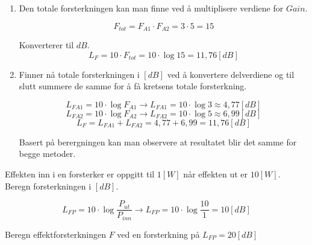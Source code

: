 \begin{solution}[name=Løsningsforslag oppgave]
	\begin{enumerate}[label=\roman*)]
		\item Den totale forsterkningen kan man finne ved å multiplisere verdiene for $Gain$.
		
\[F_{tot}=F_{A1} \cdot F_{A2}= 3 \cdot 5 = 15\]

Konverterer til $dB$.
\[L_F=10 \cdot F_{tot} = 10 \cdot \log 15 = 11,76[dB]\]

	\item Finner nå totale forsterkningen i $[dB]$ ved å konvertere delverdiene og til slutt summere de samme for å få kretsens totale forsterkning.
	
\[L_{FA1}=10\cdot \log F_{A1} \rightarrow L_{FA1}=10 \cdot \log 3 \approx 4,77 [dB]\]
\[L_{FA2}=10 \cdot \log F_{A2} \rightarrow L_{FA2}=10 \cdot \log 5 \approx 6,99 [dB]\]
\[L_F = L_{FA1}+L_{FA2} = 4,77+6,99 = 11,76 [dB]\]

Basert på berergningen kan man observere at resultatet blir det samme for begge metoder.
	
	\end{enumerate}

\end{solution}
\vspace{0.5cm} %


\begin{question}[name=Oppgave, topic=forsterkning]
Effekten inn i en forsterker er oppgitt til $1[W]$ når effekten ut er $10[W]$. Beregn forsterkningen i $[dB]$.
\end{question}

\vspace{0.5cm} %

\begin{solution}[name=Løsningsforslag oppgave]
\[L_{FP}=10\cdot \log \frac{P_{ut}}{P_{inn}} \rightarrow L_{FP}=10 \cdot \log\frac{10}{1}=10[dB]\]
	
\end{solution}


\vspace{0.5cm} %

\begin{question}[name=Oppgave, topic=forsterkning]
Beregn effektforsterkningen $F$ ved en forsterkning på $L_{FP}=20[dB]$
\end{question}

\vspace{0.5cm} %

